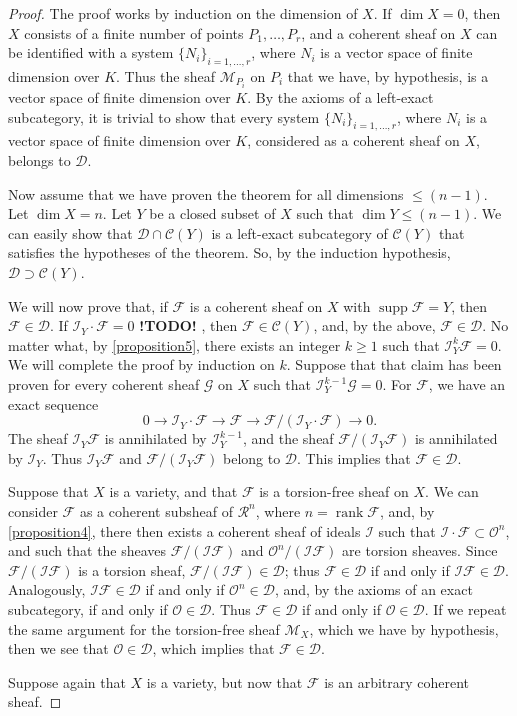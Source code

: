\documentclass{article}
\theoremstyle{plain}
\theoremstyle{definition}
\newcommand{\sh}{\mathscr}
\newcommand{\cat}{\mathcal}
\renewcommand{\geq}{\geqslant}
\renewcommand{\leq}{\leqslant}
\DeclareMathOperator{\supp}{supp}
\DeclareMathOperator{\rank}{rank}
\newcommand{\todo}{\textbf{ !TODO! }}
\newcommand{\oldpage}[1]{\marginpar{\footnotesize$\Big\vert$ \textit{p.~#1}}}
\begin{document}
\begin{proof}
  The proof works by induction on the dimension of $X$.
  If $\dim X=0$, then $X$ consists of a finite number of points $P_1,\ldots,P_r$, and a coherent sheaf on $X$ can be identified with a system $\{N_i\}_{i=1,\ldots,r}$, where $N_i$ is a vector space of finite dimension over $K$.
  Thus the sheaf $\sh{M}_{P_i}$ on $P_i$ that we have, by hypothesis, is a vector space of finite dimension over $K$.
  By the axioms of a left-exact subcategory, it is trivial to show that every system $\{N_i\}_{i=1,\ldots,r}$, where $N_i$ is a vector space of finite dimension over $K$, considered as a coherent sheaf on $X$, belongs to $\cat{D}$.

  Now assume that we have proven the theorem for all dimensions $\leq (n-1)$.
  Let $\dim X=n$.
  Let $Y$ be a closed subset of $X$ such that $\dim Y\leq(n-1)$.
  We can easily show that $\cat{D}\cap\cat{C}(Y)$ is a left-exact subcategory of $\cat{C}(Y)$ that satisfies the hypotheses of the theorem.
  So, by the induction hypothesis, $\cat{D}\supset\cat{C}(Y)$.

  We will now prove that, if $\sh{F}$ is a coherent sheaf on $X$ with $\supp\sh{F}=Y$, then $\sh{F}\in\cat{D}$.
  If $\sh{I}_Y\cdot\sh{F}=0$ \todo, then $\sh{F}\in\cat{C}(Y)$, and, by the above, $\sh{F}\in\cat{D}$.
  No matter what, by \cref{proposition5}, there exists an integer $k\geq1$ such that $\sh{I}_Y^k\sh{F}=0$.
  We will complete the proof by induction on $k$.
  Suppose that that claim has been proven for every coherent sheaf $\sh{G}$ on $X$ such that $\sh{I}_Y^{k-1}\sh{G}=0$.
  For $\sh{F}$, we have an exact sequence
  \[
    0 \to \sh{I}_Y\cdot\sh{F} \to \sh{F} \to \sh{F}/(\sh{I}_Y\cdot\sh{F}) \to 0.
  \]
  The sheaf $\sh{I}_Y\sh{F}$ is annihilated by $\sh{I}_Y^{k-1}$, and the sheaf $\sh{F}/(\sh{I}_Y\sh{F})$ is annihilated by $\sh{I}_Y$.
  Thus $\sh{I}_Y\sh{F}$ and $\sh{F}/(\sh{I}_Y\sh{F})$ belong to $\cat{D}$.
  This implies that $\sh{F}\in\cat{D}$.

  Suppose that $X$ is a variety, and that $\sh{F}$ is a torsion-free sheaf on $X$.
  We can consider $\sh{F}$ as a coherent subsheaf of $\sh{R}^n$, where $n=\rank\sh{F}$, and, by \cref{proposition4}, there then exists a coherent sheaf of ideals $\sh{I}$ such that $\sh{I}\cdot\sh{F}\subset\sh{O}^n$, and such that the sheaves $\sh{F}/(\sh{I}\sh{F})$ and $\sh{O}^n/(\sh{I}\sh{F})$ are torsion sheaves.
  Since $\sh{F}/(\sh{I}\sh{F})$ is a torsion sheaf, $\sh{F}/(\sh{I}\sh{F})\in\cat{D}$;
  thus $\sh{F}\in\cat{D}$ if and only if $\sh{I}\sh{F}\in\cat{D}$.
  Analogously, $\sh{I}\sh{F}\in\cat{D}$ if and only if $\sh{O}^n\in\cat{D}$, and, by the axioms of an exact subcategory, if and only if $\sh{O}\in\cat{D}$.
  Thus $\sh{F}\in\cat{D}$ if and only if
\oldpage{4-05}
  $\sh{O}\in\cat{D}$.
  If we repeat the same argument for the torsion-free sheaf $\sh{M}_X$, which we have by hypothesis, then we see that $\sh{O}\in\cat{D}$, which implies that $\sh{F}\in\cat{D}$.

  Suppose again that $X$ is a variety, but now that $\sh{F}$ is an arbitrary coherent sheaf.
\end{proof}
\end{document}
